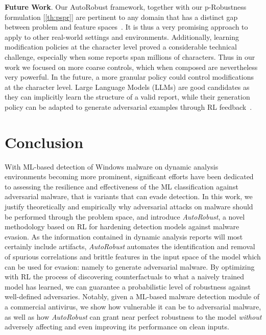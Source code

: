 \textbf{Future Work}. Our AutoRobust framework, together with our p-Robustness formulation [\ref{th:pspr}] are pertinent to any domain that has a distinct gap between problem and feature spaces~\cite{dyrmishi2023empirical}.
It is thus a very promising approach to apply to other real-world settings and environments.
Additionally, learning modification policies at the character level proved a considerable technical challenge, especially when some reports span millions of characters.
Thus in our work we focused on more coarse controls, which when composed are nevertheless very powerful.
In the future, a more granular policy could control modifications at the character level.
Large Language Models (LLMs) are good candidates as they can implicitly learn the structure of a valid report, while their generation policy can be adapted to generate adversarial examples through \gls{RL} feedback~\cite{christiano2017deep}.

\section{Conclusion}

With ML-based detection of Windows malware on dynamic analysis environments becoming more prominent,  significant efforts have been dedicated to assessing the resilience and effectiveness of the ML classification against adversarial malware, that is variants that can evade detection.
In this work, we justify theoretically and empirically why adversarial attacks on malware should be performed through the problem space, and introduce \textit{AutoRobust}, a novel methodology based on \gls{RL} for hardening detection models against malware evasion.
As the information contained in dynamic analysis reports will most certainly include artifacts, \textit{AutoRobust} automates the identification and removal of spurious correlations and brittle features in the input space of the model which can be used for evasion: namely to generate adversarial malware.
By optimizing with \gls{RL} the process of discovering counterfactuals to what a naively trained model has learned, we can guarantee a probabilistic level of robustness against well-defined adversaries.
Notably, given a ML-based malware detection module of a commercial antivirus, we show how vulnerable it can be to adversarial malware, as well as how \textit{AutoRobust} can grant near perfect robustness to the model \textit{without} adversely affecting and even improving its performance on clean inputs.